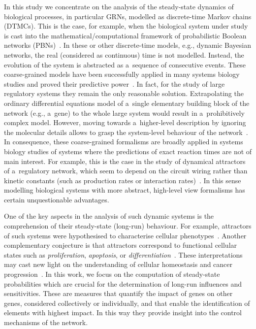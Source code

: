 \documentclass[runningheads,a4paper]{llncs}
\begin{document}
In this study we concentrate on the analysis of the steady-state dynamics of biological processes,
in particular GRNs, modelled as discrete-time Markov chains (DTMCs). This is the case, for
example, when the biological system under study is cast into the mathematical/computational
framework of probabilistic Boolean networks (PBNs)~\cite{SDZ02,TMPTSS13}. In these or other
discrete-time models, e.g., dynamic Bayesian networks, the real (considered as continuous) time
is not modelled. Instead, the evolution of the system is abstracted as a~sequence of consecutive
events. These coarse-grained models have been successfully applied in many systems biology studies
and proved their predictive power~\cite{AO03}. In fact, for the study of large regulatory systems
they remain the only reasonable solution. Extrapolating the ordinary differential equations model
of a~single elementary building block of the network (e.g., a~gene) to the whole large system
would result in a~prohibitively complex model. However, moving towards a~higher-level description
by ignoring the molecular details allows to grasp the system-level behaviour of the
network~\cite{Bornholdt05}.
In consequence, these coarse-grained formalisms are broadly applied in
systems biology studies of systems where the predictions of exact reaction times are not
of main interest. For example, this is the case in the study of dynamical attractors of
a~regulatory network, which seem to depend on the circuit wiring rather than kinetic constants
(such as production rates or interaction rates)~\cite{Wagner05}. In this sense
modelling biological systems with more abstract, high-level view formalisms has certain
unquestionable advantages.

One of the key aspects in the analysis of such dynamic systems is the comprehension of their
steady-state (long-run) behaviour. For example, attractors of such systems were hypothesised to
characterise cellular phenotypes~\cite{Kauffman69a}. Another complementary conjecture is that attractors correspond to functional cellular states such
as \emph{proliferation}, \emph{apoptosis}, or \emph{differentiation}~\cite{Huang01}.
These interpretations may cast new light on the understanding of cellular homeostasis and cancer
progression~\cite{SDZ02}. In this work, we focus on the computation of steady-state probabilities
which are crucial for the determination of long-run influences and sensitivities. These are
measures that quantify the impact of genes on other genes, considered collectively or
individually, and that enable the identification of elements with highest impact. In this way they
provide insight into the control mechanisms of the network.
\end{document}
